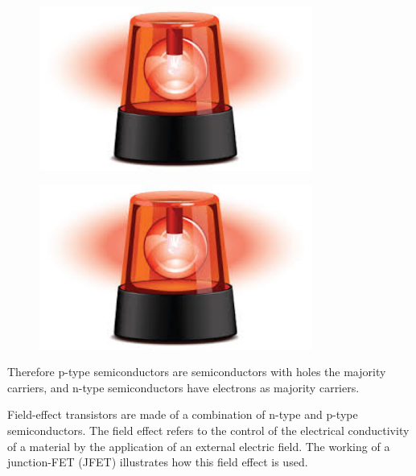 \begin{figure}[!ht]
 \begin{center}
  \includegraphics[width=0.8\textwidth]{alarm}
  \caption{}
  \label{fig:ndoping}
 \end{center}
\end{figure}

\begin{figure}[!ht]
 \begin{center}
  \includegraphics[width=0.8\textwidth]{alarm}
  \caption{}
  \label{fig:pdoping}
 \end{center}
\end{figure}

Therefore p-type semiconductors are semiconductors with holes the majority carriers, and n-type semiconductors have electrons as majority carriers.

Field-effect transistors are made of a combination of n-type and p-type semiconductors. The field effect refers to the control of the electrical conductivity of a material by the application of an external electric field. The working of a junction-FET (JFET) illustrates how this field effect is used.

